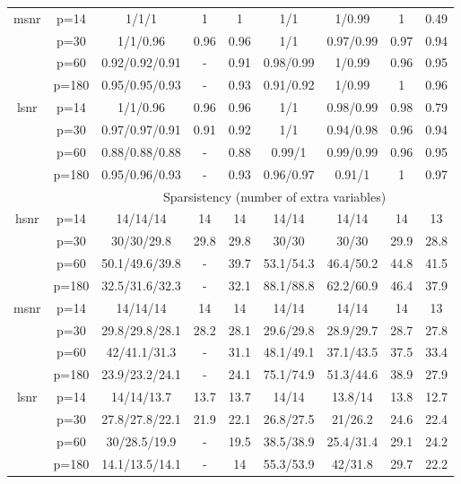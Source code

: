 \begin{table}[ht]
{\begin{tabular}{|c|c|ccccccc|}
  \midrule\multirow{4}[2]{*}{msnr} & p=14 & 1/1/1 & 1 & 1 & 1/1 & 1/0.99 & 1 & 0.49 \\ 
   & p=30 & 1/1/0.96 & 0.96 & 0.96 & 1/1 & 0.97/0.99 & 0.97 & 0.94 \\ 
   & p=60 & 0.92/0.92/0.91 & - & 0.91 & 0.98/0.99 & 1/0.99 & 0.96 & 0.95 \\ 
   & p=180 & 0.95/0.95/0.93 & - & 0.93 & 0.91/0.92 & 1/0.99 & 1 & 0.96 \\ 
  \midrule\multirow{4}[2]{*}{lsnr} & p=14 & 1/1/0.96 & 0.96 & 0.96 & 1/1 & 0.98/0.99 & 0.98 & 0.79 \\ 
   & p=30 & 0.97/0.97/0.91 & 0.91 & 0.92 & 1/1 & 0.94/0.98 & 0.96 & 0.94 \\ 
   & p=60 & 0.88/0.88/0.88 & - & 0.88 & 0.99/1 & 0.99/0.99 & 0.96 & 0.95 \\ 
   & p=180 & 0.95/0.96/0.93 & - & 0.93 & 0.96/0.97 & 0.91/1 & 1 & 0.97 \\ 
   \midrule 
 \multicolumn{1}{|c}{} &       & \multicolumn{7}{c|}{Sparsistency (number of extra variables)} \\
\midrule\multirow{4}[2]{*}{hsnr} & p=14 & 14/14/14 & 14 & 14 & 14/14 & 14/14 & 14 & 13 \\ 
   & p=30 & 30/30/29.8 & 29.8 & 29.8 & 30/30 & 30/30 & 29.9 & 28.8 \\ 
   & p=60 & 50.1/49.6/39.8 & - & 39.7 & 53.1/54.3 & 46.4/50.2 & 44.8 & 41.5 \\ 
   & p=180 & 32.5/31.6/32.3 & - & 32.1 & 88.1/88.8 & 62.2/60.9 & 46.4 & 37.9 \\ 
  \midrule\multirow{4}[2]{*}{msnr} & p=14 & 14/14/14 & 14 & 14 & 14/14 & 14/14 & 14 & 13 \\ 
   & p=30 & 29.8/29.8/28.1 & 28.2 & 28.1 & 29.6/29.8 & 28.9/29.7 & 28.7 & 27.8 \\ 
   & p=60 & 42/41.1/31.3 & - & 31.1 & 48.1/49.1 & 37.1/43.5 & 37.5 & 33.4 \\ 
   & p=180 & 23.9/23.2/24.1 & - & 24.1 & 75.1/74.9 & 51.3/44.6 & 38.9 & 27.9 \\ 
  \midrule\multirow{4}[2]{*}{lsnr} & p=14 & 14/14/13.7 & 13.7 & 13.7 & 14/14 & 13.8/14 & 13.8 & 12.7 \\ 
   & p=30 & 27.8/27.8/22.1 & 21.9 & 22.1 & 26.8/27.5 & 21/26.2 & 24.6 & 22.4 \\ 
   & p=60 & 30/28.5/19.9 & - & 19.5 & 38.5/38.9 & 25.4/31.4 & 29.1 & 24.2 \\ 
   & p=180 & 14.1/13.5/14.1 & - & 14 & 55.3/53.9 & 42/31.8 & 29.7 & 22.2 \\ 
   \bottomrule 
\end{tabular}
}
\end{table}
